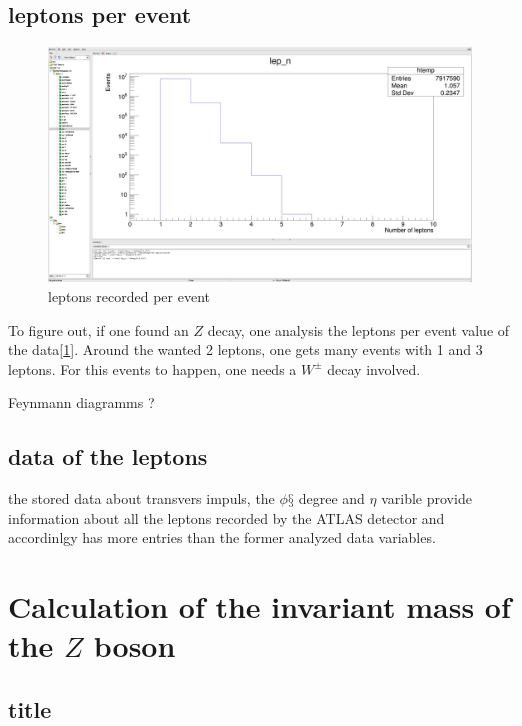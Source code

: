\documentclass[12pt, a4paper, bibliography=totoc]{scrreprt}
\begin{document}
\subsection{leptons per event}
\begin{figure}
	\centering
	\includegraphics[scale=0.15]{fig/number_produced_leptons.png}
	\caption{leptons recorded per event}
	\label{lep_n}
\end{figure}
To figure out, if one found an $Z$ decay, one analysis the leptons per event value of the data[\ref{lep_n}].
Around the wanted 2 leptons, one gets many events with 1 and 3 leptons. For this events to happen, one needs a $W^{\pm}$ decay involved.

Feynmann diagramms ?

\subsection{data of the leptons}
the stored data about transvers impuls, the $\phi§$ degree and $\eta$ varible provide information about all the leptons recorded by the ATLAS detector and accordinlgy has more entries than the former analyzed data variables.

\section{Calculation of the invariant mass of the $Z$ boson}

\subsection{title} 
\nocite{*}
\appendix
\printbibliography
\end{document}
